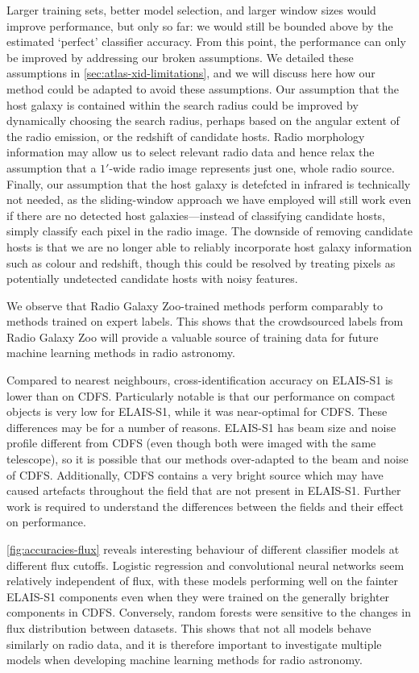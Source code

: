 \documentclass[11pt, a4paper]{book}
\begin{document}
  Larger training sets, better model selection, and larger window sizes would
  improve performance, but only so far: we would still be bounded above by the
  estimated `perfect' classifier accuracy. From this point, the performance
  can only be improved by addressing our broken assumptions. We detailed
  these assumptions in \autoref{sec:atlas-xid-limitations}, and we will discuss here how
  {our method could be adapted to avoid these assumptions}. Our assumption that the host galaxy is contained
  within the search radius could be improved by dynamically choosing the
  search radius, perhaps based on the angular extent of the radio emission, or the
  redshift of candidate hosts. Radio morphology information may allow us to
  select relevant radio data and hence relax the assumption that a $1'$-wide
  radio image represents just one, whole radio source. Finally, our assumption
  that the host galaxy is detefcted in infrared is technically not needed, as
  the sliding-window approach we have employed will still work even if there
  are no detected host galaxies---instead of classifying candidate hosts,
  simply classify each pixel in the radio image. The downside of removing
  candidate hosts is that we are no longer able to reliably incorporate host
  galaxy information such as colour and redshift, though this could be
  resolved by treating pixels as potentially undetected candidate hosts with
  noisy features.

  We observe that Radio Galaxy Zoo-trained methods perform comparably to
  methods trained on expert labels. This shows that the crowdsourced labels
  from Radio Galaxy Zoo will provide a valuable source of training
  data for future machine learning methods in radio astronomy.

  Compared to nearest neighbours, cross-identification accuracy on ELAIS-S1 is
  lower than on CDFS. Particularly notable is that our performance on compact
  objects is very low for ELAIS-S1, while it was near-optimal for CDFS. These
  differences may be for a number of reasons. ELAIS-S1 has beam size and noise
  profile different from CDFS (even though both were imaged with the same
  telescope), so it is possible that our methods over-adapted to the beam and
  noise of CDFS. Additionally, CDFS contains a very bright source which may
  have caused artefacts throughout the field that are not present in ELAIS-S1.
  Further work is required to understand the differences between the fields
  and their effect on performance.

  \autoref{fig:accuracies-flux} reveals interesting behaviour of different
  classifier models at different flux cutoffs. Logistic regression and
  convolutional neural networks seem relatively independent of flux, with
  these models performing well on the fainter ELAIS-S1 components even when
  they were trained on the generally brighter components in CDFS. Conversely,
  random forests were sensitive to the changes in flux distribution between
  datasets. This shows that not all models behave similarly on radio data,
  and it is therefore important to investigate multiple models when
  developing machine learning methods for radio astronomy.
\end{document}
